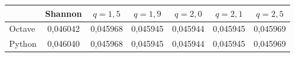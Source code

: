 \begin{tabular}{lcccccc}
\toprule
 & Shannon & $q=1{,}5$ & $q=1{,}9$ & $q=2{,}0$ & $q=2{,}1$ & $q=2{,}5$ \\
\midrule
Octave & 0{,}046042 & 0{,}045968 & 0{,}045945 & 0{,}045944 & 0{,}045945 & 0{,}045969 \\
Python & 0{,}046040 & 0{,}045968 & 0{,}045945 & 0{,}045944 & 0{,}045945 & 0{,}045969 \\
\bottomrule
\end{tabular}
